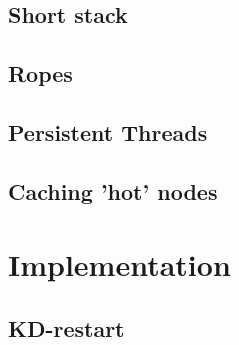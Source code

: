 \subsection{Short stack}


\subsection{Ropes}


\subsection{Persistent Threads}


\subsection{Caching 'hot' nodes}


\section{Implementation}

\subsection{KD-restart}


